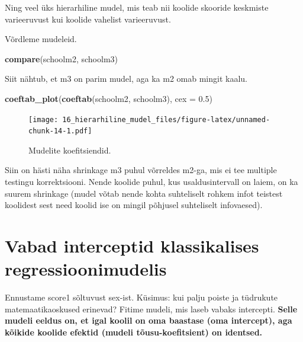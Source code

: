 \documentclass[]{book}
\newenvironment{Shaded}{\begin{snugshade}}{\end{snugshade}}
\newcommand{\DataTypeTok}[1]{\textcolor[rgb]{0.13,0.29,0.53}{#1}}
\newcommand{\FloatTok}[1]{\textcolor[rgb]{0.00,0.00,0.81}{#1}}
\newcommand{\KeywordTok}[1]{\textcolor[rgb]{0.13,0.29,0.53}{\textbf{#1}}}
\newcommand{\NormalTok}[1]{#1}
\begin{document}
Ning veel üks hierarhiline mudel, mis teab nii koolide skooride keskmiste varieeruvust kui koolide vahelist varieeruvust.

Võrdleme mudeleid.

\begin{Shaded}
\begin{Highlighting}[]
\KeywordTok{compare}\NormalTok{(schoolm2, schoolm3)}
\end{Highlighting}
\end{Shaded}

Siit nähtub, et m3 on parim mudel, aga ka m2 omab mingit kaalu.

\begin{Shaded}
\begin{Highlighting}[]
\KeywordTok{coeftab_plot}\NormalTok{(}\KeywordTok{coeftab}\NormalTok{(schoolm2, schoolm3), }\DataTypeTok{cex =} \FloatTok{0.5}\NormalTok{)}
\end{Highlighting}
\end{Shaded}

\begin{figure}
\centering
\texttt{[image: 16\_hierarhiline\_mudel\_files/figure-latex/unnamed-chunk-14-1.pdf]}
\caption{\label{fig:unnamed-chunk-14}Mudelite koefitsiendid.}
\end{figure}

Siin on hästi näha shrinkage m3 puhul võrreldes m2-ga, mis ei tee multiple testingu korrektsiooni.
Nende koolide puhul, kus usaldusintervall on laiem, on ka suurem shrinkage (mudel võtab nende kohta suhteliselt rohkem infot teistest koolidest sest need koolid ise on mingil põhjusel suhteliselt infovaesed).

\hypertarget{vabad-interceptid-klassikalises-regressioonimudelis}{%
\section{Vabad interceptid klassikalises regressioonimudelis}\label{vabad-interceptid-klassikalises-regressioonimudelis}}

Ennustame score1 sõltuvust sex-ist. Küsimus: kui palju poiste ja tüdrukute matemaatikaoskused erinevad? Fitime mudeli, mis laseb vabaks intercepti. \textbf{Selle mudeli eeldus on, et igal koolil on oma baastase (oma intercept), aga kõikide koolide efektid (mudeli tõusu-koefitsient) on identsed.}
\end{document}
